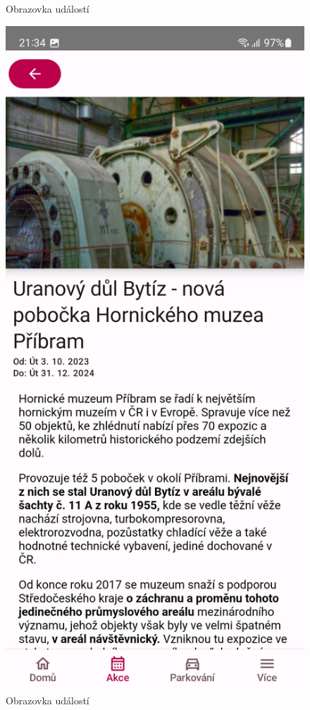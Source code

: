 \begin{figure}[H]
    \caption{Obrazovka událostí}
  \endminipage\hfill
    \includegraphics[width=\linewidth]{screens/2a.jpg}
    \caption{Obrazovka událostí}
  \endminipage\hfill
\end{figure}


